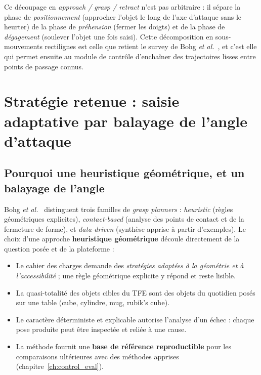 Ce découpage en \textit{approach / grasp / retract} n'est pas arbitraire : il
sépare la phase de \emph{positionnement} (approcher l'objet le long de l'axe
d'attaque sans le heurter) de la phase de \emph{préhension} (fermer les doigts) et
de la phase de \emph{dégagement} (soulever l'objet une fois saisi). Cette
décomposition en sous-mouvements rectilignes est celle que retient le survey de
Bohg \textit{et al.}~\cite{bohg_data-driven_2014}, et c'est elle qui permet
ensuite au module de contrôle d'enchaîner des trajectoires lisses entre points
de passage connus.

\section{Stratégie retenue : saisie adaptative par balayage de l'angle d'attaque}
\label{sec:plan_topdown}

\subsection{Pourquoi une heuristique géométrique, et un balayage de l'angle}

Bohg \textit{et al.}~\cite{bohg_data-driven_2014} distinguent trois familles de
\textit{grasp planners} : \textit{heuristic} (règles géométriques explicites),
\textit{contact-based} (analyse des points de contact et de la fermeture de
forme), et \textit{data-driven} (synthèse apprise à partir d'exemples). Le choix
d'une approche \textbf{heuristique géométrique} découle directement de la
question posée et de la plateforme :

\begin{itemize}
  \item Le cahier des charges demande des \emph{stratégies adaptées à la
        géométrie et à l'accessibilité} ; une règle géométrique explicite y
        répond et reste lisible.
  \item La quasi-totalité des objets cibles du TFE sont des objets du quotidien
        posés sur une table (cube, cylindre, mug, rubik's cube).
  \item Le caractère déterministe et explicable autorise l'analyse d'un échec :
        chaque pose produite peut être inspectée et reliée à une cause.
  \item La méthode fournit une \textbf{base de référence reproductible} pour les
        comparaisons ultérieures avec des méthodes apprises
        (chapitre~\ref{ch:control_eval}).
\end{itemize}

